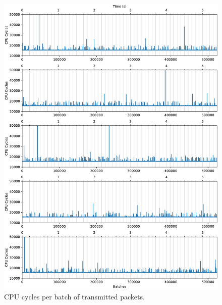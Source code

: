 \begin{figure}%
    \centering
    \includegraphics[width=1.0\textwidth]{figures/iotlb-baseline-no-iommu}
    \caption{CPU cycles per batch of transmitted packets.}
    \label{fig:cycles-no-iommu}
\end{figure}

